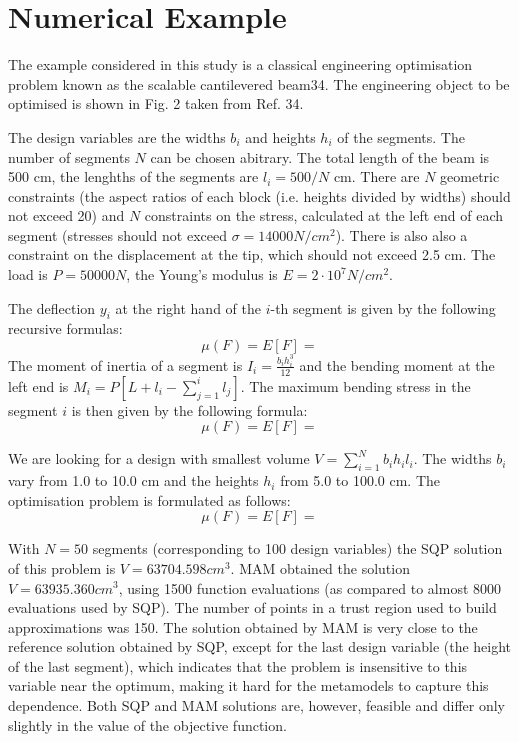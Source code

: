 \documentclass[10pt,twocolumn,a4paper]{article}
\begin{document}
\section{Numerical Example}

The example considered in this study is a classical engineering optimisation problem known as the scalable cantilevered beam34. The engineering object to be optimised is shown in Fig. 2 taken from Ref. 34.


The design variables are the widths $b_i$ and heights $h_i$ of the segments. The number of segments $N$ can be chosen abitrary. The total length of the beam is 500 cm, the lenghths of the segments are $l_i=500/N$  cm. There are $N$ geometric constraints (the aspect ratios of each block (i.e. heights divided by widths) should not exceed 20) and $N$ constraints on the stress, calculated at the left end of each segment (stresses should not exceed  $\sigma=14000 N/cm^2$). There is also also a constraint on the displacement at the tip, which should not exceed 2.5 cm. The load is $P = 50 000 N$, the Young's modulus is $E=2\cdot 10^7  N/cm^2$.

The deflection $y_i$ at the right hand of the $i$-th segment is given by the following recursive formulas:
\begin{displaymath}
  \mu (F)=E[F]=
\end{displaymath}
The moment of inertia of a segment is $I_i=\frac{b_i h_i^3}{12}$ and the bending moment at the left end is $M_i=P[L+l_i- \sum_{j=1}^{i}  l_j ]$. The maximum bending stress in the segment $i$ is then given by the following formula:
\begin{displaymath}
  \mu (F)=E[F]=
\end{displaymath}

We are looking for a design with smallest volume $V = \sum_{i=1}^N b_i h_i l_i$. The widths $b_i$ vary from 1.0 to 10.0 cm and the heights $h_i$ from 5.0 to 100.0 cm. The optimisation problem is formulated as follows:
\begin{displaymath}
  \mu (F)=E[F]=
\end{displaymath}

With $N=50$ segments (corresponding to 100 design variables) the SQP solution of this problem is $V = 63704.598 cm^3$. MAM obtained the solution $V = 63935.360 cm^3$, using 1500 function evaluations (as compared to almost 8000 evaluations used by SQP). The number of points in a trust region used to build approximations was 150. The solution obtained by MAM is very close to the reference solution obtained by SQP, except for the last design variable (the height of the last segment), which indicates that the problem is insensitive to this variable near the optimum, making it hard for the metamodels to capture this dependence. Both SQP and MAM solutions are, however, feasible and differ only slightly in the value of the objective function.
\end{document}
